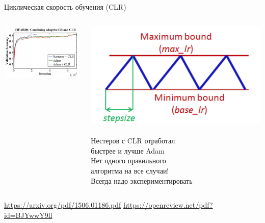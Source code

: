 \documentclass[notes,12pt, aspectratio=169]{beamer}
\begin{document}
\begin{frame}{Циклическая скорость обучения (CLR)}
	\begin{columns}[T] %
	\begin{column}{.48\textwidth}
		\centering \includegraphics[scale=0.55]{cycle_2.png}
	\end{column}%
	\hfill%
	\begin{column}{.48\textwidth}
	\centering \includegraphics[scale=0.17]{cycle.png} \\ \mbox{ } \\
	Нестеров с CLR отработал \\ быстрее и лучше Adam \\ \alert{Нет одного правильного \\ алгоритма на все случаи!}  \\ Всегда надо экспериментировать
	\end{column}%
	\end{columns}
	
	\vfill %
	\footnotesize  
	\color{blue} \url{https://arxiv.org/pdf/1506.01186.pdf} \newline  \url{https://openreview.net/pdf?id=BJYwwY9ll}
\end{frame}
\end{document}
